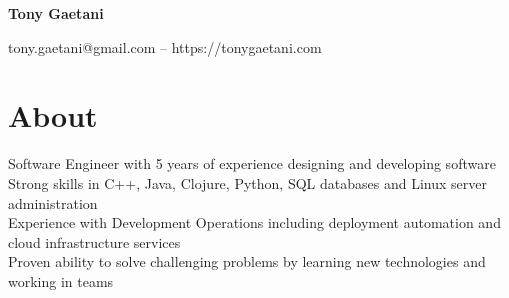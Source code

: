 \documentclass{article}
\begin{document}
\begin{center}
{\LARGE\bf Tony Gaetani}\\
\end{center}
\begin{center}
tony.gaetani@gmail.com -- https://tonygaetani.com
\end{center}

\section*{About}
Software Engineer with 5 years of experience designing and developing software\\
Strong skills in C++, Java, Clojure, Python, SQL databases and Linux server administration\\
Experience with Development Operations including deployment automation and cloud infrastructure services\\
Proven ability to solve challenging problems by learning new technologies and working in teams\\
\end{document}
